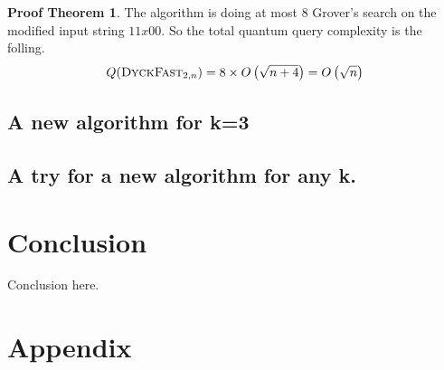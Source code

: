\documentclass[11pt,a4paper]{article}
\theoremstyle{definition}
\theoremstyle{plain}
\theoremstyle{definition}
\newtheorem{tproof}{Proof Theorem}[section]
\begin{document}
\begin{tproof}
    The algorithm is doing at most 8 Grover's search on the modified input string $11x00$.
    So the total quantum query complexity is the folling.
    \[Q(\textsc{DyckFast}_{2, n}) = 8\times O\left(\sqrt{n+4}\right) = O\left(\sqrt{n}\right)\]
\end{tproof}

\subsection{A new algorithm for k=3}

\subsection{A try for a new algorithm for any k.}



\section{Conclusion}

Conclusion here.




\listoffigures
\listofalgorithms

\newpage

\section{Appendix}
\end{document}
